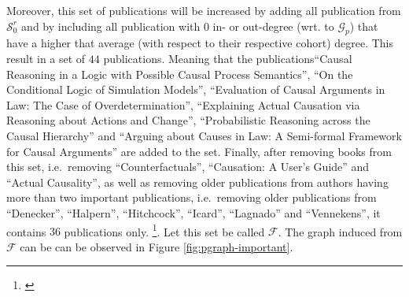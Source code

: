 \documentclass[11pt,a4paper]{book}
\theoremstyle{definition}
\theoremstyle{definition}
\theoremstyle{definition}
\theoremstyle{remark}
\newcommand{\psetz}{S_{\mathit{0}}}
\newcommand{\fxset}{\mathcal{F}}
\newcommand{\xsetz}{\mathcal{S}_{\mathit{0}}}
\newcommand{\pgraph}{\mathcal{G}_{p}}
\begin{document}
Moreover, this set of publications will be increased by adding all publication from $\xsetz^r$ and by including all publication with $0$ in- or out-degree (wrt. to $\pgraph$) that have a higher that average (with respect to their respective cohort) degree.
%
%
This result in a set of $44$ publications. Meaning that the publications``Causal Reasoning in a Logic with Possible Causal Process Semantics'', ``On the Conditional Logic of Simulation Models'', ``Evaluation of Causal Arguments in Law: The Case of Overdetermination'', ``Explaining Actual Causation via Reasoning about Actions and Change'', ``Probabilistic Reasoning across the Causal Hierarchy'' and ``Arguing about Causes in Law: A Semi-formal Framework for Causal Arguments'' are added to the set.
Finally, after removing books from this set, i.e.\ removing  ``Counterfactuals'',  ``Causation: A User's Guide'' and ``Actual Causality'', as well as removing older publications from authors having more than two important publications, i.e.\ removing older publications from ``Denecker'', ``Halpern'', ``Hitchcock'', ``Icard'', ``Lagnado'' and ``Vennekens'',  it contains $36$ publications only.
\footnote{\parencite{vennekens2010embracing,
bex2010hybrid,
lee2010representing,
lifschitz2010translating,
glymour2010actual,
claassen2010causal,
gerstenberg2010spreading,
halpern2011actual,
shulz2011if,
briggs2012interventionist,
baumgartner2013regularity,
hyttinen2013discovering,
halpern2015graded,
weslake2015partial,
chockler2015causal,
beckers2016general,
schaffer2016grounding,
halpern2016appropriate,
blanchard2017cause,
wright2017ness,
icard2017normality,
aleksandrowicz2017computational,
fenton2017proposed,
lagnado2017causation,
bochman2018actual,
ibeling2018conditional,
beckers2018principled,
bochman2018laws,
denecker2018causal,
batusov2018situation,
denecker2019explaining,
liepicna2019evaluation,
leblanc2019explaining,
liepicna2020arguing,
khannecessary,
ibeling2020probabilistic}}. 
Let this set be called $\fxset$.
The graph induced from $\fxset$ can be can be observed in Figure \ref{fig:pgraph-important}.
\end{document}
